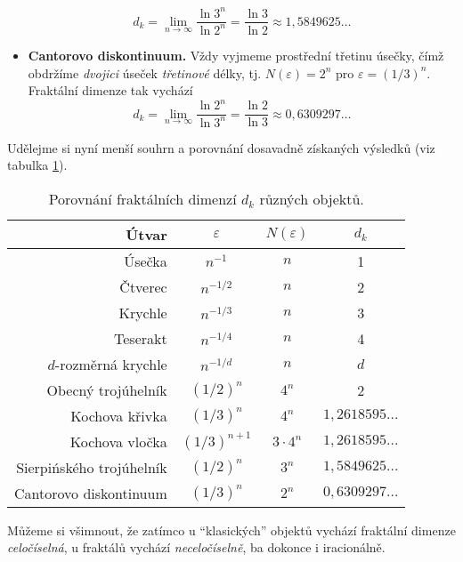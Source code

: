 \begin{itemize}
    \begin{equation}\label{eq:sierpinskeho-trojuhelnik-dimenze}
        d_k=\lim_{n\to\infty}{\dfrac{\ln{3^n}}{\ln{2^{n}}}}=\dfrac{\ln{3}}{\ln{2}}\approx 1{,}5849625\dots
    \end{equation}
    \item \textbf{Cantorovo diskontinuum.} Vždy vyjmeme prostřední třetinu úsečky, čímž obdržíme \emph{dvojici} úseček \emph{třetinové} délky, tj. $N(\varepsilon)=2^n$ pro $\varepsilon=(1/3)^n$. Fraktální dimenze tak vychází
    \begin{equation}\label{eq:cantorovo-diskontinuum-dimenze}
        d_k=\lim_{n\to\infty}{\dfrac{\ln{2^n}}{\ln{3^n}}}=\dfrac{\ln{2}}{\ln{3}}\approx 0{,}6309297\dots
    \end{equation}
\end{itemize}
Udělejme si nyní menší souhrn a porovnání dosavadně získaných výsledků (viz tabulka \ref{table:fraktaly-eukleides-dimenze}).
\begin{table}[h]
    \centering
    \begin{tabular}{r|ccc}
        Útvar                    & $\varepsilon$ & $N(\varepsilon)$ & $d_k$              \\ \hline
        Úsečka                   & $n^{-1}$      & $n$              & 1                  \\
        Čtverec                  & $n^{-1/2}$    & $n$              & 2                  \\
        Krychle                  & $n^{-1/3}$    & $n$              & 3                  \\
        Teserakt                 & $n^{-1/4}$    & $n$              & 4                  \\
        $d$-rozměrná krychle     & $n^{-1/d}$    & $n$              & $d$                \\
        Obecný trojúhelník       & $(1/2)^n$     & $4^n$            & 2                  \\
        Kochova křivka           & $(1/3)^n$     & $4^n$            & $1{,}2618595\dots$ \\
        Kochova vločka           & $(1/3)^{n+1}$ & $3\cdot 4^n$     & $1{,}2618595\dots$ \\
        Sierpińského trojúhelník & $(1/2)^n$     & $3^n$            & $1{,}5849625\dots$ \\
        Cantorovo diskontinuum   & $(1/3)^n$     & $2^n$            & $0{,}6309297\dots$ \\
    \end{tabular}
    \caption{Porovnání fraktálních dimenzí $d_k$ různých objektů.}
    \label{table:fraktaly-eukleides-dimenze}
\end{table}
Můžeme si všimnout, že zatímco u ``klasických'' objektů vychází fraktální dimenze \emph{celočíselná}, u fraktálů vychází \emph{neceločíselně}, ba dokonce i iracionálně.